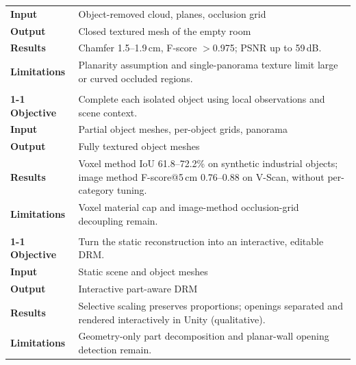 \begin{table}[hbtp]
\begin{tabularx}{\textwidth}{@{}>{\bfseries}p{2cm}X@{}}
Input & Object-removed cloud, planes, occlusion grid \\
Output & Closed textured mesh of the empty room \\
Results & Chamfer 1.5--1.9\,cm, F-score $>$0.975; PSNR up to 59\,dB. \\
Limitations & Planarity assumption and single-panorama texture limit large or curved occluded regions. \\
\midrule
\multicolumn{2}{@{}l}{\textbf{Object completion (Ch.~\ref{ch:7_Object_Completion})}~\cite{vermandere_geometry_2025, vermandere_guided_2025}} \\
\cmidrule(r){1-1}
Objective & Complete each isolated object using local observations and scene context. \\
Input & Partial object meshes, per-object grids, panorama \\
Output & Fully textured object meshes \\
Results & Voxel method IoU 61.8--72.2\% on synthetic industrial objects; image method F-score@5\,cm 0.76--0.88 on V-Scan, without per-category tuning. \\
Limitations & Voxel material cap and image-method occlusion-grid decoupling remain. \\
\midrule
\multicolumn{2}{@{}l}{\textbf{Scene dynamification (Ch.~\ref{ch:8_Scene_Dynamification})}~\cite{vermandere_adaptive_2026}} \\
\cmidrule(r){1-1}
Objective & Turn the static reconstruction into an interactive, editable \gls{DRM}. \\
Input & Static scene and object meshes \\
Output & Interactive part-aware \gls{DRM} \\
Results & Selective scaling preserves proportions; openings separated and rendered interactively in Unity (qualitative). \\
Limitations & Geometry-only part decomposition and planar-wall opening detection remain. \\
\bottomrule
\end{tabularx}
\end{table}

